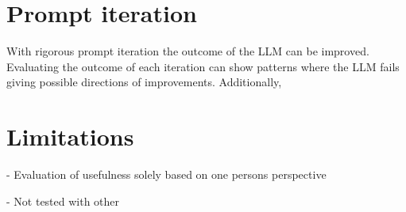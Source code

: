 \section{Prompt iteration}

With rigorous prompt iteration the outcome of the LLM can be improved. Evaluating the outcome of each iteration can show patterns where the LLM fails giving possible directions of improvements. Additionally, 


\section{Limitations}

- Evaluation of usefulness solely based on one persons perspective

- Not tested with other